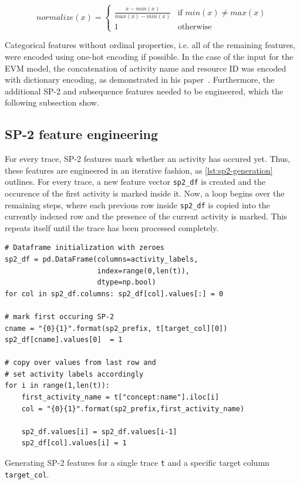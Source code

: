 $$normalize(x) =
\begin{cases}
\frac{x-min(x)}{max(x)-min(x)} & \text{if } min(x) \neq max(x)\\
1 & \text{otherwise}
\end{cases}
$$

Categorical features without ordinal properties, i.e. all of the remaining features, were encoded using one-hot encoding if possible. In the case of the input for the EVM model, the concatenation of activity name and resource ID was encoded with dictionary encoding, as demonstrated in his paper~\cite{evermann2016}. Furthermore, the additional SP-2 and subsequence features needed to be engineered, which the following subsection show.

\subsection*{SP-2 feature engineering}
For every trace, SP-2 features mark whether an activity has occured yet. Thus, these features are engineered in an iterative fashion, as \autoref{lst:sp2-generation} outlines. For every trace, a new feature vector \texttt{sp2\_df} is created and the occurence of the first activity is marked inside it. Now, a loop begins over the remaining steps, where each previous row inside \texttt{sp2\_df} is copied into the currently indexed row and the presence of the current activity is marked. This repeats itself until the trace has been processed completely.

\begin{listing}[ht]
\begin{verbatim}
# Dataframe initialization with zeroes
sp2_df = pd.DataFrame(columns=activity_labels,
                      index=range(0,len(t)),
                      dtype=np.bool)
for col in sp2_df.columns: sp2_df[col].values[:] = 0

# mark first occuring SP-2
cname = "{0}{1}".format(sp2_prefix, t[target_col][0])
sp2_df[cname].values[0]  = 1

# copy over values from last row and
# set activity labels accordingly
for i in range(1,len(t)):
    first_activity_name = t["concept:name"].iloc[i]
    col = "{0}{1}".format(sp2_prefix,first_activity_name)

    sp2_df.values[i] = sp2_df.values[i-1]
    sp2_df[col].values[i] = 1
\end{verbatim}
\caption{Generating SP-2 features for a single trace \texttt{t} and a specific target column \texttt{target\_col}.}
\label{lst:sp2-generation}
\end{listing}

